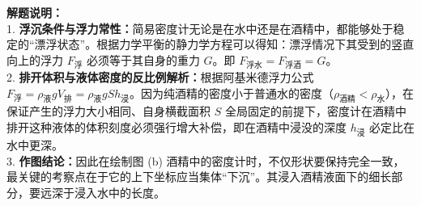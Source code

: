 \begin{center}
\end{center}

\vspace{0.6cm}

{\small\color{gray}
\textbf{解题说明：}\\
1. \textbf{浮沉条件与浮力常性：}简易密度计无论是在水中还是在酒精中，都能够处于稳定的“漂浮状态”。根据力学平衡的静力学方程可以得知：漂浮情况下其受到的竖直向上的浮力 $F_{\text{浮}}$ 必须等于其自身的重力 $G$。即 $F_{\text{浮水}} = F_{\text{浮酒}} = G$。\\
2. \textbf{排开体积与液体密度的反比例解析：}根据阿基米德浮力公式 $F_{\text{浮}} = \rho_{\text{液}} g V_{\text{排}} = \rho_{\text{液}} g S h_{\text{浸}}$。因为纯酒精的密度小于普通水的密度（$\rho_{\text{酒精}} < \rho_{\text{水}}$），在保证产生的浮力大小相同、自身横截面积 $S$ 全局固定的前提下，密度计在酒精中排开这种液体的体积刻度必须强行增大补偿，即在酒精中浸没的深度 $h_{\text{浸}}$ 必定比在水中更深。\\
3. \textbf{作图结论：}因此在绘制图 (b) 酒精中的密度计时，不仅形状要保持完全一致，最关键的考察点在于它的上下坐标应当集体“下沉”。其浸入酒精液面下的细长部分，要远深于浸入水中的长度。
}

\vspace{0.6cm}

